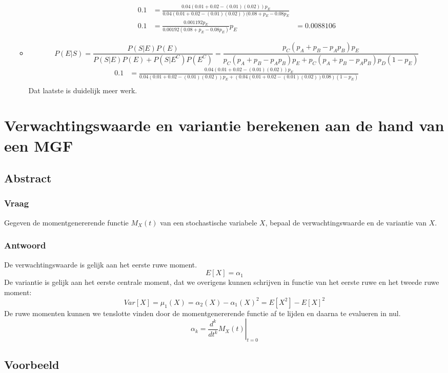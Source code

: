 \documentclass[main.tex]{subfiles}
\begin{document}
\begin{enumerate}
\begin{itemize}
\begin{align*}
      0.1&=\frac{0.04(0.01+0.02-(0.01)(0.02))p_{E}}{0.04(0.01+0.02-(0.01)(0.02))(0.08 + p_{E} - 0.08p_{E}} \\
      0.1&=\frac{0.001192p_{E}}{0.00192(0.08 + p_{E} - 0.08p_{E})}
      p_{E}&= 0.0088106
    \end{align*}
  \item
    \[
      P(E | S)
      = \frac{P(S|E)P(E)}{P(S|E)P(E) + P(S|E^{C})P(E^{C})}
      =\frac{p_{C}(p_{A}+p_{B}-p_{A}p_{B})p_{E}}{p_{C}(p_{A}+p_{B}-p_{A}p_{B})p_{E} + p_{C}(p_{A} + p_{B} - p_{A}p_{B})p_{D}(1-p_{E})}
    \]
    \begin{align*}
      0.1 &= \frac{0.04(0.01+0.02-(0.01)(0.02))p_{E}}{0.04(0.01+0.02-(0.01)(0.02))p_{E} + (0.04(0.01+0.02-(0.01)(0.02))0.08)(1-p_{E})}\\
    \end{align*}
    Dat laatste is duidelijk meer werk.
  \end{itemize}
\end{enumerate}


\newpage
\section{Verwachtingswaarde en variantie berekenen aan de hand van een MGF}
\subsection*{Abstract}
\subsubsection*{Vraag}
Gegeven de momentgenererende functie $M_{X}(t)$ van een stochastische variabele $X$, bepaal de verwachtingswaarde en de variantie van $X$.

\subsubsection*{Antwoord}
De verwachtingswaarde is gelijk aan het eerste ruwe moment.
\[ E[X] = \alpha_{1} \]
De variantie is gelijk aan het eerste centrale moment, dat we overigens kunnen schrijven in functie van het eerste ruwe en het tweede ruwe moment:
\[ Var[X] = \mu_{1}(X) = \alpha_{2}(X) - \alpha_{1}(X)^{2} = E[X^{2}] - E[X]^{2} \]
De ruwe momenten kunnen we tenslotte vinden door de momentgenererende functie af te lijden en daarna te evalueren in nul.
\[ \alpha_{k} = \left.\frac{d^{k}}{dt^{k}}M_{X}(t)\right|_{t=0} \]

\subsection*{Voorbeeld}
\end{document}

